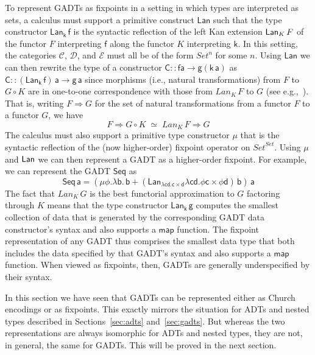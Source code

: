 \documentclass[submission,copyright,creativecommons]{eptcs}
\begin{document}
To represent GADTs as fixpoints in a setting in which types are
interpreted as sets, a calculus must support a primitive construct
$\mathsf{Lan}$ such that the type constructor $\mathsf{Lan_k\,f}$ is
the syntactic reflection of the left Kan extension $\mathsf{Lan}_K \,F$ of the
functor $F$ interpreting $\mathsf{f}$ along the functor $K$
interpreting $\mathsf{k}$. In this setting, the categories
$\mathcal{C}$, $\mathcal{D}$, and $\mathcal{E}$ must all be of the
form $\mathit{Set}^n$ for some $n$. Using $\mathsf{Lan}$ we can then
rewrite the type of a constructor $\mathsf{C :: f a \to g(k\,a)}$ as
$\mathsf{C :: (Lan_k\,f)\,a \to g\,a}$ since morphisms (i.e., natural
transformations) from $F$ to $G \circ K$ are in one-to-one
correspondence with those from $\mathit{Lan}_K\,F$ to $G$ (see
e.g.,~\cite{rie16}). That is, writing $F \Rightarrow G$ for the set of
natural transformations from a functor $F$ to a functor $G$, we have
\begin{equation}\label{eq:nat-transfs}
F \Rightarrow G \circ K\; \simeq \; Lan_K\,F \Rightarrow G
\end{equation}
The calculus must also support a primitive type
constructor $\mathsf{\mu}$ that is the syntactic reflection of the
(now higher-order) fixpoint operator on
$\mathit{Set}^\mathit{Set}$. Using $\mu$ and $\mathsf{Lan}$ we can then
represent a GADT as a higher-order fixpoint. For example,
we can represent the GADT $\mathsf{Seq}$ as
\[\mathsf{Seq\,a} = \mathsf{(\mu \phi.\lambda b.\, b + (Lan_{\lambda c
    d. c \times d} \lambda c d. \phi c \times \phi d)\,b)\,a}\] The
fact that $Lan_K\,G$ is the best functorial approximation to $G$
factoring through $K$ means that the type constructor
$\mathsf{Lan_k\,g}$ computes the smallest collection of data that is
generated by the corresponding GADT data constructor's syntax and also
supports a $\mathsf{map}$ function. The fixpoint representation of any
GADT thus comprises the smallest data type that both includes the data
specified by that GADT's syntax and also supports a $\mathsf{map}$
function.
When viewed as fixpoints, then,
GADTs are generally underspecified by
their syntax.

\vspace*{0.05in}

In this section we have seen that GADTs can be represented either as
Church encodings or as fixpoints. This exactly mirrors the situation
for ADTs and nested types described in Sections~\ref{sec:adts}
and~\ref{sec:gadts}. But whereas the two representations are always
isomorphic for ADTs and nested types, they are not, in general, the
same for GADTs. This will be proved in the next section.
\end{document}
